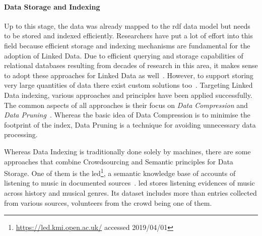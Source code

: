 \paragraph{Data Storage and Indexing} 
Up to this stage, the data was already mapped to the \gls{rdf} data model but needs to be stored and indexed efficiently. Researchers have put a lot of effort into this field because efficient storage and indexing mechanisms are fundamental for the adoption of Linked Data. Due to efficient querying and storage capabilities of relational databases resulting from decades of research in this area, it makes sense to adopt these approaches for Linked Data as well~\cite{abadi2007}. However, to support storing very large quantities of data there exist custom solutions too~\cite{broekstra2002}. Targeting Linked Data indexing, various approaches and principles have been applied successfully. The common aspects of all approaches is their focus on \emph{Data Compression} and \emph{Data Pruning}~\cite{svoboda2011}. Whereas the basic idea of Data Compression is to minimise the footprint of the index, Data Pruning is a technique for avoiding unnecessary data processing. 

Whereas Data Indexing is traditionally done solely by machines, there are some approaches that combine Crowdsourcing and Semantic principles for Data Storage. One of them is the \gls{led}\footnote{\url{https://led.kmi.open.ac.uk/} accessed 2019/04/01}, a semantic knowledge base of accounts of listening to music in documented sources~\cite{adamou2014}. \gls{led} stores listening evidences of music across history and musical genres. Its dataset includes more than  entries collected from various sources, volunteers from the crowd being one of them. 

